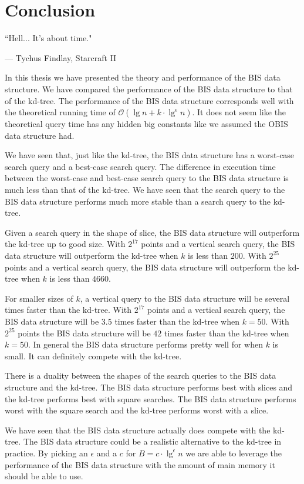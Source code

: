 \chapter{Conclusion}
\label{ch:conclusion}


\epigraph{``Hell... It's about time."}{--- \textup{Tychus Findlay}, Starcraft II}

In this thesis we have presented the theory and performance of the BIS data structure. We have compared the performance of the BIS data structure to that of the kd-tree. The performance of the BIS data structure corresponds well with the theoretical running time of $\mathcal{O}(\lg n + k\cdot\lg^\epsilon n)$. It does not seem like the theoretical query time has any hidden big constants like we assumed the OBIS data structure had.

We have seen that, just like the kd-tree, the BIS data structure has a worst-case search query and a best-case search query. The difference in execution time between the worst-case and best-case search query to the BIS data structure is much less than that of the kd-tree. We have seen that the search query to the BIS data structure performs much more stable than a search query to the kd-tree.

Given a search query in the shape of slice, the BIS data structure will outperform the kd-tree up to good size. With $2^{17}$ points and a vertical search query, the BIS data structure will outperform the kd-tree when $k$ is less than $200$. With $2^{25}$ points and a vertical search query, the BIS data structure will outperform the kd-tree when $k$ is less than $4660$. 

For smaller sizes of $k$, a vertical query to the BIS data structure will be several times faster than the kd-tree. With $2^{17}$ points and a vertical search query, the BIS data structure will be $3.5$ times faster than the kd-tree when $k = 50$. With $2^{25}$ points the BIS data structure will be $42$ times faster than the kd-tree when $k = 50$. In general the BIS data structure performs pretty well for when $k$ is small. It can definitely compete with the kd-tree.

There is a duality between the shapes of the search queries to the BIS data structure and the kd-tree. The BIS data structure performs best with slices and the kd-tree performs best with square searches. The BIS data structure performs worst with the square search and the kd-tree performs worst with a slice.

We have seen that the BIS data structure actually does compete with the kd-tree. The BIS data structure could be a realistic alternative to the kd-tree in practice. By picking an $\epsilon$ and a $c$ for $B = c\cdot\lg^\epsilon n$ we are able to leverage the performance of the BIS data structure with the amount of main memory it should be able to use.
